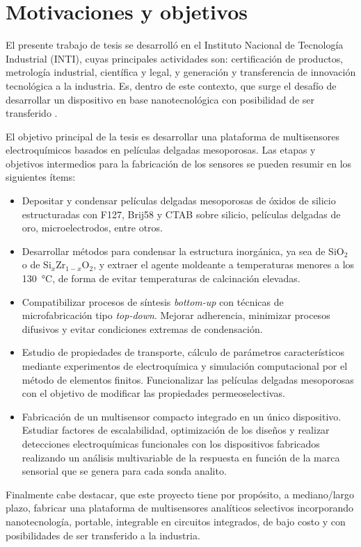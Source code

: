 


 		    	
\section{Motivaciones y objetivos}

	El presente trabajo de tesis se desarrolló en el Instituto Nacional de Tecnología Industrial (INTI), cuyas principales actividades son: certificación de productos, metrología industrial, científica y legal, y generación y transferencia	de innovación tecnológica a la industria. Es, dentro de este contexto, que surge el desafío de desarrollar un dispositivo en base nanotecnológica con posibilidad de ser transferido . 

	El objetivo principal de la tesis es desarrollar una plataforma de multisensores electroquímicos basados en películas delgadas mesoporosas. Las etapas y objetivos intermedios para la fabricación de los sensores se pueden resumir en los siguientes ítems:

	\begin{itemize}
		
		\item Depositar y condensar películas delgadas mesoporosas de óxidos de silicio estructuradas con F127, Brij58 y CTAB sobre silicio, películas delgadas de oro, microelectrodos, entre otros.  
		
		\item Desarrollar métodos para condensar la estructura inorgánica, ya sea de SiO$_2$ o de Si$_{x}$Zr$_{1-x}$O$_2$, y extraer el agente moldeante a temperaturas menores a los \SI{130}{\celsius}, de forma de evitar temperaturas de calcinación elevadas.

		\item Compatibilizar procesos de síntesis \textit{bottom-up} con técnicas de microfabricación tipo \textit{top-down}. Mejorar adherencia, minimizar procesos difusivos y evitar condiciones extremas de condensación.

		\item Estudio de propiedades de transporte, cálculo de parámetros característicos mediante experimentos de electroquímica y simulación computacional por el método de elementos finitos. Funcionalizar las películas delgadas mesoporosas con el objetivo de modificar las propiedades permeoselectivas.

		\item Fabricación de un multisensor compacto integrado en un único dispositivo. Estudiar factores de escalabilidad, optimización de los diseños y realizar detecciones electroquímicas funcionales con los dispositivos fabricados realizando un análisis multivariable de la respuesta en función de la marca sensorial que se genera para cada sonda analito.

		\end{itemize}	

	Finalmente cabe destacar, que este proyecto tiene por propósito, a mediano/largo plazo, fabricar una plataforma de multisensores analíticos selectivos incorporando nanotecnología, portable, integrable en circuitos integrados, de bajo costo y con posibilidades de ser transferido a la industria.